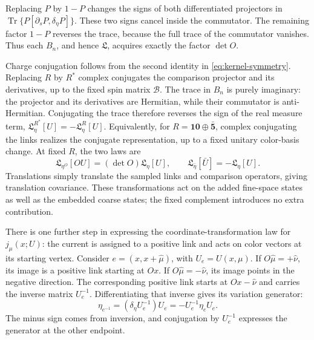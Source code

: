 \documentclass[11pt,a4paper]{article}
\theoremstyle{remark}
\DeclareMathOperator{\Tr}{Tr}
\begin{document}
Replacing $P$ by $1-P$ changes the signs of both differentiated
projectors in $\Tr\{P[\partial_sP,\delta_\eta P]\}$.
These two signs cancel inside the commutator. The remaining factor
$1-P$ reverses the trace, because the full trace of the commutator
vanishes. Thus each $B_n$, and hence $\mathfrak L$, acquires exactly
the factor $\det O$.

Charge conjugation follows from the second identity in
\eqref{eq:kernel-symmetry}. Replacing $R$ by $R^*$ complex
conjugates the comparison projector and its derivatives, up to the
fixed spin matrix $\mathcal B$. The trace in $B_n$ is purely
imaginary: the projector and its derivatives are Hermitian, while
their commutator is anti-Hermitian. Conjugating the trace therefore
reverses the sign of the real measure term,
$\mathfrak L^{R^*}_\eta[U]=-\mathfrak L^R_\eta[U]$.
Equivalently, for $R=\mathbf{10}\oplus\bar{\mathbf5}$,
complex conjugating the links realizes the conjugate representation,
up to a fixed unitary color-basis change. At fixed $R$, the two laws are
\begin{equation}
 \mathfrak L_{\eta^O}[OU]=(\det O)\mathfrak L_\eta[U],\qquad
 \mathfrak L_{\bar\eta}[\bar U]=-\mathfrak L_\eta[U].
 \label{eq:axial}
\end{equation}
Translations simply translate the sampled links and comparison
operators, giving translation covariance. These transformations act
on the added fine-space states as well as the embedded coarse states;
the fixed complement introduces no extra contribution.

There is one further step in expressing the coordinate-transformation
law for $j_\mu(x;U)$: the current is assigned to a positive link
and acts on color vectors at its starting vertex.
Consider $e=(x,x+\hat\mu)$, with $U_e=U(x,\mu)$.
If $O\hat\mu=+\hat\nu$, its image is a positive link starting
at $Ox$. If $O\hat\mu=-\hat\nu$, its image points in the
negative direction. The corresponding positive link starts at
$Ox-\hat\nu$ and carries the inverse matrix $U_e^{-1}$.
Differentiating that inverse gives its variation generator:
\begin{equation}
 \eta_{e^{-1}}=(\delta_\eta U_e^{-1})U_e
              =-U_e^{-1}\eta_e U_e.
\end{equation}
The minus sign comes from inversion, and conjugation by $U_e^{-1}$
expresses the generator at the other endpoint.
\end{document}

